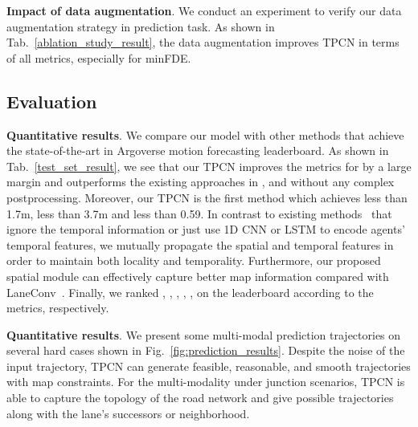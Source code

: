 \documentclass[final]{cvpr}
\begin{document}
\textbf{Impact of data augmentation}. We conduct an experiment to verify our data augmentation strategy in prediction task. As shown in Tab.~\ref{ablation_study_result}, the data augmentation improves TPCN in terms of all metrics, especially for minFDE.  







\subsection{Evaluation}
\textbf{Quantitative results}. We compare our model with other methods that achieve the state-of-the-art in Argoverse motion forecasting leaderboard. As shown in Tab.~\ref{test_set_result}, we see that our TPCN improves the metrics for  by a large margin and outperforms the existing approaches in ,  and  without any complex postprocessing. Moreover, our TPCN is the first method which achieves  less than 1.7m,  less than 3.7m and  less than 0.59. In contrast to existing methods~\cite{chang2019argoverse} that ignore the temporal information or just use 1D CNN or LSTM to encode agents' temporal features, we mutually propagate the spatial and temporal features in order to maintain both locality and temporality. Furthermore, our proposed spatial module can effectively capture better map information compared with LaneConv~\cite{liang2020learning}. Finally, we ranked , , , , ,  on the leaderboard according to the metrics, respectively.

\textbf{Quantitative results}. We present some multi-modal prediction trajectories on several hard cases shown in Fig.~\ref{fig:prediction_results}. Despite the noise of the input trajectory, TPCN can generate feasible, reasonable, and smooth trajectories with map constraints. For the multi-modality under junction scenarios, TPCN is able to capture the topology of the road network and give possible trajectories along with the lane's successors or neighborhood.
\end{document}
